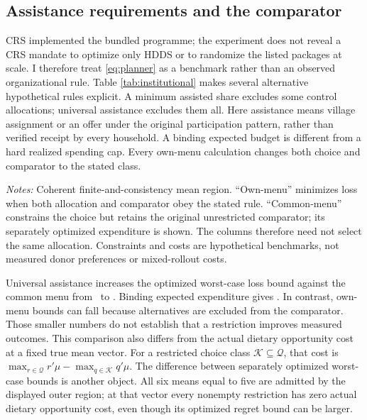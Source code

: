 \documentclass[11pt]{article}
\begin{document}
\subsection{Assistance requirements and the comparator}

CRS implemented the bundled programme; the experiment does not reveal a CRS mandate to optimize only HDDS or to randomize the listed packages at scale. I therefore treat \eqref{eq:planner} as a benchmark rather than an observed organizational rule. Table \ref{tab:institutional} makes several alternative hypothetical rules explicit. A minimum assisted share excludes some control allocations; universal assistance excludes them all. Here assistance means village assignment or an offer under the original participation pattern, rather than verified receipt by every household. A binding expected budget is different from a hard realized spending cap. Every own-menu calculation changes both choice and comparator to the stated class.

\begin{table}[t]
\centering\caption{Regret protection under hypothetical institutional rules}\label{tab:institutional}
\resizebox{\textwidth}{!}{}
\begin{minipage}{\textwidth}\footnotesize\emph{Notes:} Coherent finite-and-consistency mean region. ``Own-menu'' minimizes loss when both allocation and comparator obey the stated rule. ``Common-menu'' constrains the choice but retains the original unrestricted comparator; its separately optimized expenditure is shown. The columns therefore need not select the same allocation. Constraints and costs are hypothetical benchmarks, not measured donor preferences or mixed-rollout costs.\end{minipage}
\end{table}

Universal assistance increases the optimized worst-case loss bound against the common menu from \TightMeanLoss\ to \UniversalCommonLoss. Binding expected expenditure gives \BindingCommonLoss. In contrast, own-menu bounds can fall because alternatives are excluded from the comparator. Those smaller numbers do not establish that a restriction improves measured outcomes. This comparison also differs from the actual dietary opportunity cost at a fixed true mean vector. For a restricted choice class $\mathcal K\subseteq\mathcal Q$, that cost is $\max_{r\in\mathcal Q}r'\mu-\max_{q\in\mathcal K}q'\mu$. The difference between separately optimized worst-case bounds is another object. All six means equal to five are admitted by the displayed outer region; at that vector every nonempty restriction has zero actual dietary opportunity cost, even though its optimized regret bound can be larger.
\end{document}
